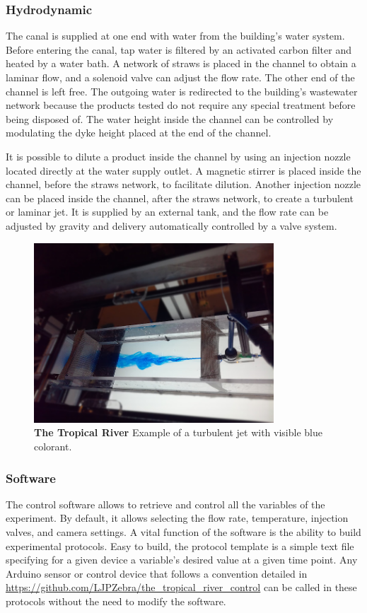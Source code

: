   \subsubsection{Hydrodynamic}
  The canal is supplied at one end with water from the building's water system. Before entering the canal, tap water is filtered by an activated carbon filter and heated by a water bath. A network of straws is placed in the channel to obtain a laminar flow, and a solenoid valve can adjust the flow rate. The other end of the channel is left free. The outgoing water is redirected to the building's wastewater network because the products tested do not require any special treatment before being disposed of. The water height inside the channel can be controlled by modulating the dyke height placed at the end of the channel.

  It is possible to dilute a product inside the channel by using an injection nozzle located directly at the water supply outlet. A magnetic stirrer is placed inside the channel, before the straws network, to facilitate dilution. Another injection nozzle can be placed inside the channel, after the straws network, to create a turbulent or laminar jet. It is supplied by an external tank, and the flow rate can be adjusted by gravity and delivery automatically controlled by a valve system.

    \begin{figure}[h]
      \centering
      \includegraphics[width=0.80\textwidth]{part_2/assets/river_flow.jpg}
      \caption{\textbf{The Tropical River} Example of a turbulent jet with visible blue colorant.}
    \end{figure}

  \subsubsection{Software}
  The control software allows to retrieve and control all the variables of the experiment. By default, it allows selecting the flow rate, temperature, injection valves, and camera settings. A vital function of the software is the ability to build experimental protocols. Easy to build, the protocol template is a simple text file specifying for a given device a variable's desired value at a given time point. Any Arduino sensor or control device that follows a convention detailed in \url{https://github.com/LJPZebra/the_tropical_river_control} can be called in these protocols without the need to modify the software.

